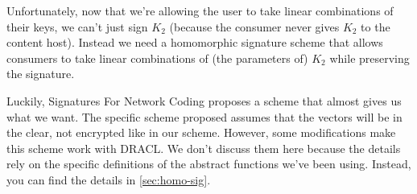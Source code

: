 \documentclass[pdftex,12pt,a4papaer,twoside,notitlepage]{report}
\begin{document}
Unfortunately, now that we're allowing the user to take linear combinations of
their keys, we can't just sign $K_2$ (because the consumer never gives $K_2$ to
the content host). Instead we need a homomorphic signature scheme that allows
consumers to take linear combinations of (the parameters of) $K_2$ while
preserving the signature.

Luckily, Signatures For Network Coding\cite{signature} proposes a scheme that
almost gives us what we want. The specific scheme proposed assumes that the
vectors will be in the clear, not encrypted like in our scheme. However, some
modifications make this scheme work with DRACL. We don't discuss them here
because the details rely on the specific definitions of the abstract functions
we've been using. Instead, you can find the details in \cref{sec:homo-sig}.

\end{document}
